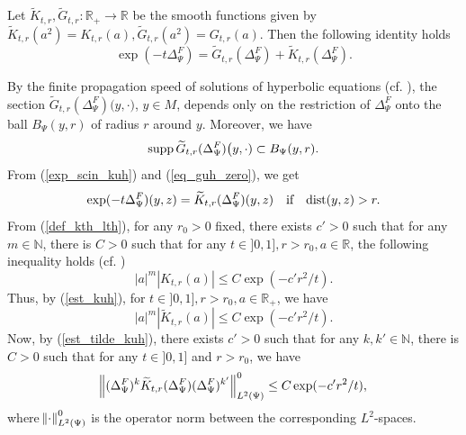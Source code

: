 \documentclass[12pt]{article}
\numberwithin{equation}{section}
\theoremstyle{theorem}
\theoremstyle{definition}
\theoremstyle{remark}
\newcommand{\real}{\mathbb{R}}
\newcommand{\nat}{\mathbb{N}}
\newcommand{\dist}{{\rm{dist}}}
\newcommand{\laplcomp}{\Delta}
\begin{document}
	Let $\widetilde{K}_{t,r}, \widetilde{G}_{t,r} : \real_+ \to \real$ be the smooth functions given by $\widetilde{K}_{t,r}(a^2) = K_{t,r}(a), \widetilde{G}_{t,r}(a^2) = G_{t, r}(a)$. Then the following identity holds
	\begin{equation}\label{exp_scin_kuh}
		\exp(-t \laplcomp_{\Psi}^{F} ) 
		 = 
		\widetilde{G}_{t,r}(\laplcomp_{\Psi}^{F}) + 
		\widetilde{K}_{t,r}(\laplcomp_{\Psi}^{F}).
	\end{equation}
	\par
	By the finite propagation speed of solutions of hyperbolic equations (cf. \cite[Theorems D.2.1, 4.2.8]{MaHol}), the section $\widetilde{G}_{t,r}(\laplcomp_{\Psi}^{F}) \big(y, \cdot \big)$, $y \in M$, depends only on the restriction of $\laplcomp_{\Psi}^{F}$ onto the ball $B_{\Psi}(y, r)$ of radius $r$ around $y$. Moreover, we have
	\begin{equation}\label{eq_guh_zero}
		{\rm{supp}}\, \widetilde{G}_{t,r}(\laplcomp_{\Psi}^{F}) \big(y, \cdot) \subset B_{\Psi}(y, r).
	\end{equation}
	From (\ref{exp_scin_kuh}) and (\ref{eq_guh_zero}), we get
	\begin{equation}\label{eq_exp_kuh_id}
		\exp(-t \laplcomp_{\Psi}^{F})(y, z) = \widetilde{K}_{t,r}(\laplcomp_{\Psi}^{F})(y, z) \quad \text{if} \quad \dist(y, z) > r.
	\end{equation}
	From (\ref{def_kth_lth}), for any $r_0 > 0$ fixed, there exists $c' > 0$ such that for any $m \in \nat$, there is $C>0$ such that for any $t \in ]0, 1], r > r_0, a\in \real$, the following inequality holds (cf. \cite[(4.2.12)]{MaHol})
	\begin{equation}\label{est_kuh}
		|a|^m | K_{t, r}(a) |  \leq C \exp (- c' r^2/t ).
	\end{equation}
	Thus, by (\ref{est_kuh}), for $t \in ]0,1], r > r_0, a \in \real_+$, we have
	\begin{equation}\label{est_tilde_kuh}
		|a|^m | \widetilde{K}_{t, r}(a) |  \leq C \exp ( -c' r^2/ t ).
	\end{equation}
	Now, by (\ref{est_tilde_kuh}), there exists $c' > 0$ such that for any $k, k' \in \nat$, there is $C > 0$ such that for any $t \in ]0,1]$ and $r > r_0$, we have
	\begin{equation} \label{eqn_kth_norm}
		\norm{(\laplcomp_{\Psi}^{F})^k \widetilde{K}_{t, r}( \laplcomp_{\Psi}^{F} )(\laplcomp_{\Psi}^{F})^{k'} }^{0}_{L^2(\Psi)} 
		\leq
		C \exp ( - c' r^2/ t),
	\end{equation}
	where $\norm{\cdot}^{0}_{L^2(\Psi)} $ is the operator norm between the corresponding $L^2$-spaces. 
\end{document}
